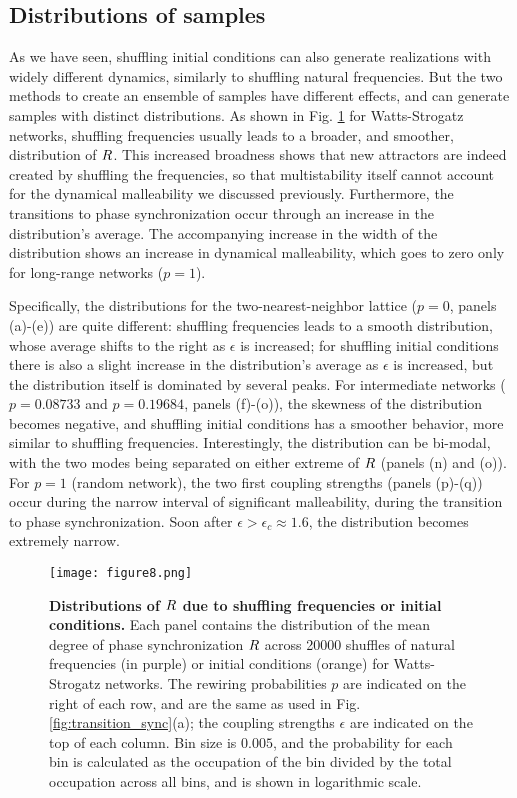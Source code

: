 \subsection{Distributions of samples}
As we have seen, shuffling initial conditions can also generate realizations with widely different dynamics, similarly to shuffling natural frequencies. But the two methods to create an ensemble of samples have different effects, and can generate samples with distinct distributions. As shown in Fig. \ref{fig:Rdistributions} for Watts-Strogatz networks, shuffling frequencies usually leads to a broader, and smoother, distribution of $R$. This increased broadness shows that new attractors are indeed created by shuffling the frequencies, so that multistability itself cannot account for the dynamical malleability we discussed previously. Furthermore, the transitions to phase synchronization occur through an increase in the distribution's average. The accompanying increase in the width of the distribution shows an increase in dynamical malleability, which goes to zero only for long-range networks ($p = 1$). 

Specifically, the distributions for the two-nearest-neighbor lattice ($p = 0$, panels (a)-(e)) are quite different: shuffling frequencies leads to a smooth distribution, whose average shifts to the right as $\epsilon$ is increased; for shuffling initial conditions there is also a slight increase in the distribution's average as $\epsilon$ is increased, but the distribution itself is dominated by several peaks. 
For intermediate networks ($p = 0.08733$ and $p = 0.19684$, panels (f)-(o)), the skewness of the distribution becomes negative, and shuffling initial conditions has a smoother behavior, more similar to shuffling frequencies. Interestingly, the distribution can be bi-modal, with the two modes being separated on either extreme of $R$ (panels (n) and (o)). 
For $p = 1$ (random network), the two first coupling strengths (panels (p)-(q)) occur during the narrow interval of significant malleability, during the transition to phase synchronization. Soon after $\epsilon > \epsilon_c \approx 1.6$, the distribution becomes extremely narrow. 
%
\begin{figure*}[htb!]
    \centering
    \texttt{[image: figure8.png]}
    \caption{\textbf{Distributions of $R$ due to shuffling frequencies or initial conditions.} Each panel contains the distribution of the mean degree of phase synchronization $R$ across 20000 shuffles of natural frequencies (in purple) or initial conditions (orange) for Watts-Strogatz networks. The rewiring probabilities $p$ are indicated on the right of each row, and are the same as used in Fig. \ref{fig:transition_sync}(a); the coupling strengths $\epsilon$ are indicated on the top of each column. Bin size is $0.005$, and the probability for each bin is calculated as the occupation of the bin divided by the total occupation across all bins, and is shown in logarithmic scale.}
    \label{fig:Rdistributions}
\end{figure*}

